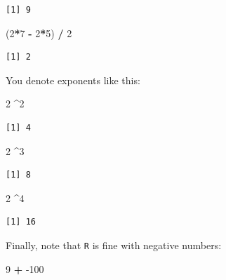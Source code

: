 \documentclass[
]{book}
\newenvironment{Shaded}{\begin{snugshade}}{\end{snugshade}}
\newcommand{\DecValTok}[1]{\textcolor[rgb]{0.00,0.00,0.81}{#1}}
\newcommand{\NormalTok}[1]{#1}
\newcommand{\OperatorTok}[1]{\textcolor[rgb]{0.81,0.36,0.00}{\textbf{#1}}}
\newcommand{\StringTok}[1]{\textcolor[rgb]{0.31,0.60,0.02}{#1}}
\begin{document}
\begin{verbatim}
[1] 9
\end{verbatim}

\begin{Shaded}
\begin{Highlighting}[]
\NormalTok{(}\DecValTok{2}\OperatorTok{*}\DecValTok{7} \OperatorTok{-}\StringTok{ }\DecValTok{2}\OperatorTok{*}\DecValTok{5}\NormalTok{) }\OperatorTok{/}\StringTok{ }\DecValTok{2}
\end{Highlighting}
\end{Shaded}

\begin{verbatim}
[1] 2
\end{verbatim}

You denote exponents like this:

\begin{Shaded}
\begin{Highlighting}[]
\DecValTok{2} \OperatorTok{^}\DecValTok{2}
\end{Highlighting}
\end{Shaded}

\begin{verbatim}
[1] 4
\end{verbatim}

\begin{Shaded}
\begin{Highlighting}[]
\DecValTok{2} \OperatorTok{^}\DecValTok{3}
\end{Highlighting}
\end{Shaded}

\begin{verbatim}
[1] 8
\end{verbatim}

\begin{Shaded}
\begin{Highlighting}[]
\DecValTok{2} \OperatorTok{^}\DecValTok{4}
\end{Highlighting}
\end{Shaded}

\begin{verbatim}
[1] 16
\end{verbatim}

Finally, note that \texttt{R} is fine with negative numbers:

\begin{Shaded}
\begin{Highlighting}[]
\DecValTok{9} \OperatorTok{+}\StringTok{ }\DecValTok{-100}
\end{Highlighting}
\end{Shaded}
\end{document}
